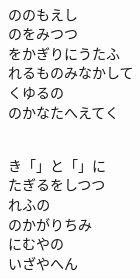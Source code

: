 \documentclass[10pt,b5j]{tarticle} %
\begin{document}
\begin{enumerate}
\begin{minipage}[c]{\blocksize}
        \vspace{\linespace}
        \item~\\
        ののもえし\\
        のをみつつ\\
        をかぎりにうたふ\\
        れるものみなかして\\
        くゆるの\\
        のかなたへえてく
        
        \vspace{\linespace}
        \item~\\
        き「」と「」に\\
        たぎるをしつつ\\
        れふの\\
        のかがりちみ\\
        にむやの\\
        いざやへん
    
    \end{minipage}
\end{enumerate} %
\end{document}
